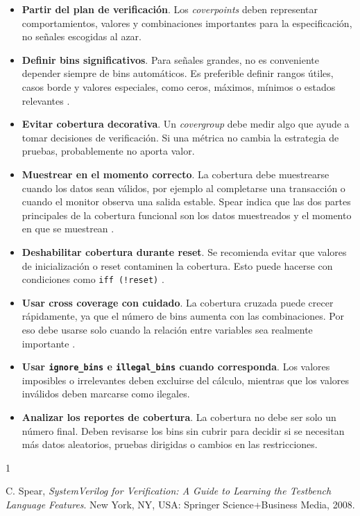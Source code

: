 ﻿\documentclass[conference]{IEEEtran}
\begin{document}
\begin{itemize}
    \item \textbf{Partir del plan de verificación}. Los \textit{coverpoints}
    deben representar comportamientos, valores y combinaciones importantes
    para la especificación, no señales escogidas al azar.

    \item \textbf{Definir bins significativos}. Para señales grandes, no es conveniente
    depender siempre de bins automáticos. Es preferible definir rangos útiles,
    casos borde y valores especiales, como ceros, máximos, mínimos o estados
    relevantes \cite{Spear2008}.

    \item \textbf{Evitar cobertura decorativa}. Un \textit{covergroup} debe medir
    algo que ayude a tomar decisiones de verificación. Si una métrica no cambia
    la estrategia de pruebas, probablemente no aporta valor.

    \item \textbf{Muestrear en el momento correcto}. La cobertura debe
    muestrearse cuando los datos sean válidos, por ejemplo al completarse una
    transacción o cuando el monitor observa una salida estable. Spear indica
    que las dos partes principales de la cobertura funcional son los datos
    muestreados y el momento en que se muestrean \cite{Spear2008}.

    \item \textbf{Deshabilitar cobertura durante reset}. Se recomienda evitar
    que valores de inicialización o reset contaminen la cobertura. Esto puede
    hacerse con condiciones como \texttt{iff (!reset)} \cite{Spear2008}.

    \item \textbf{Usar cross coverage con cuidado}. La cobertura cruzada puede
    crecer rápidamente, ya que el número de bins aumenta con las combinaciones.
    Por eso debe usarse solo cuando la relación entre variables sea realmente
    importante \cite{Spear2008}.

    \item \textbf{Usar \texttt{ignore\_bins} e \texttt{illegal\_bins} cuando
    corresponda}. Los valores imposibles o irrelevantes deben excluirse del
    cálculo, mientras que los valores inválidos deben marcarse como ilegales.

    \item \textbf{Analizar los reportes de cobertura}. La cobertura no debe ser
    solo un número final. Deben revisarse los bins sin cubrir para decidir si
    se necesitan más datos aleatorios, pruebas dirigidas o cambios en las
    restricciones.
\end{itemize}

\begin{thebibliography}{1}

C. Spear, \textit{SystemVerilog for Verification: A Guide to Learning the
Testbench Language Features}. New York, NY, USA: Springer Science+Business
Media, 2008.

\end{thebibliography}
\end{document}
